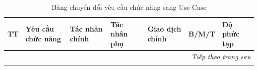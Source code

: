 \scriptsize %
\setlength{\tabcolsep}{2pt} %
\renewcommand{\arraystretch}{1.15} %

\begin{longtable}{|c|p{3.2cm}|p{2.0cm}|p{2.0cm}|p{4.8cm}|c|p{1.5cm}|}
    \caption{Bảng chuyển đổi yêu cầu chức năng sang Use Case}
    \label{tab:use_cases} \\
    
    \hline
    \textbf{TT} & \textbf{Yêu cầu chức năng} & \textbf{Tác nhân chính} & \textbf{Tác nhân phụ} & \textbf{Giao dịch chính} & \textbf{B/M/T} & \textbf{Độ phức tạp} \\
    \hline
    \endfirsthead
    
    \hline
    \endhead
    
    \hline
    \multicolumn{7}{r}{{\textit{Tiếp theo trang sau}}} \\
    \endfoot
    
    \hline
    \endlastfoot


\end{longtable}

